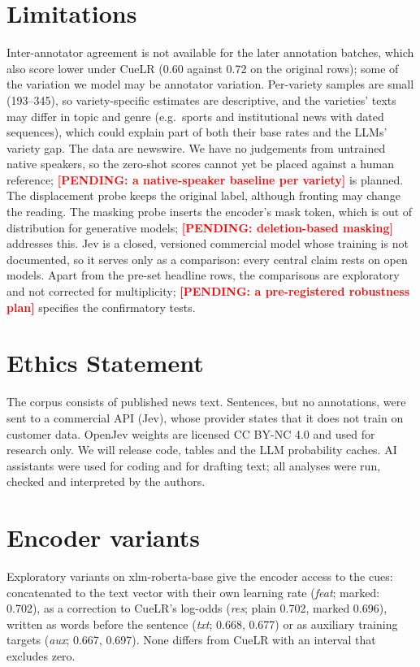 \documentclass[11pt]{article}
\newcommand{\pending}[1]{\textcolor{red}{\textbf{[PENDING: #1]}}}
\begin{document}
\section*{Limitations}
Inter-annotator agreement is not available for the later annotation batches, which also score lower under CueLR (0.60 against 0.72 on the original rows); some of the variation we model may be annotator variation. Per-variety samples are small (193--345), so variety-specific estimates are descriptive, and the varieties' texts may differ in topic and genre (e.g.\ sports and institutional news with dated sequences), which could explain part of both their base rates and the LLMs' variety gap. The data are newswire. We have no judgements from untrained native speakers, so the zero-shot scores cannot yet be placed against a human reference; \pending{a native-speaker baseline per variety} is planned. The displacement probe keeps the original label, although fronting may change the reading. The masking probe inserts the encoder's mask token, which is out of distribution for generative models; \pending{deletion-based masking} addresses this. Jev is a closed, versioned commercial model whose training is not documented, so it serves only as a comparison: every central claim rests on open models. Apart from the pre-set headline rows, the comparisons are exploratory and not corrected for multiplicity; \pending{a pre-registered robustness plan} specifies the confirmatory tests.

\section*{Ethics Statement}
The corpus consists of published news text. Sentences, but no annotations, were sent to a commercial API (Jev), whose provider states that it does not train on customer data. OpenJev weights are licensed CC BY-NC 4.0 and used for research only. We will release code, tables and the LLM probability caches. AI assistants were used for coding and for drafting text; all analyses were run, checked and interpreted by the authors.







\appendix

\section{Encoder variants}
\label{app:encoders}
Exploratory variants on xlm-roberta-base give the encoder access to the cues: concatenated to the text vector with their own learning rate (\emph{feat}; marked: 0.702), as a correction to CueLR's log-odds (\emph{res}; plain 0.702, marked 0.696), written as words before the sentence (\emph{txt}; 0.668, 0.677) or as auxiliary training targets (\emph{aux}; 0.667, 0.697). None differs from CueLR with an interval that excludes zero.
\end{document}
